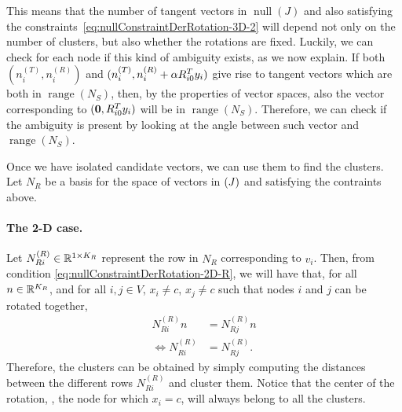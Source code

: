 \documentclass[12pt]{article}
\DeclareMathOperator{\nullspace}{null}
\DeclareMathOperator{\rangespace}{range}
\newcommand{\niT}{n_i^{(T)}}
\newcommand{\niR}{n_i^{(R)}}
\begin{document}

This means that the number of tangent vectors in $\nullspace(J)$ and also satisfying the constraints~\eqref{eq:nullConstraintDerRotation-3D-2} will depend not only on the number of clusters, but also whether the rotations are fixed. Luckily, we can check for each node if this kind of ambiguity exists, as we now explain. If both $(\niT,\niR)$ and $(\niT,\niR+\alpha R_{i0}\transpose y_i)$ give rise to tangent vectors which are both in $\rangespace(N_S)$, then, by the properties of vector spaces, also the vector corresponding to $(\boldsymbol{0}, R_{i0}^T y_i)$ will be in $\rangespace(N_S)$. Therefore, we can check if the ambiguity is present by looking at the angle between such vector and $\rangespace(N_S)$.

Once we have isolated candidate vectors, we can use them to find the clusters. Let $N_R$ be a basis for the space of vectors in $\null(J)$ and satisfying the contraints above.

\paragraph{The 2-D case.} Let $N_{Ri}^{(R)} \in \mathbb{R}^{1 \times K_R}{}$ represent the row in $N_R$ corresponding to $v_i$. Then, from condition \eqref{eq:nullConstraintDerRotation-2D-R}, we will have that, for all $n\in\mathbb{R}^{K_R}{}$, and for all $i,j\in V$, $x_i\neq c$, $x_j\neq c$ such that nodes $i$ and $j$ can be rotated together, 
\begin{align}
    N_{Ri}^{(R)}n&=N_{Rj}^{(R)}n\\
\iff N_{Ri}^{(R)}&=N_{Rj}^{(R)}.
\end{align}
Therefore, the clusters can be obtained by simply computing the distances between the different rows $N_{Ri}^{(R)}$ and cluster them. Notice that the center of the rotation, \ie, the node for which $x_i=c$, will always belong to all the clusters.
\end{document}
